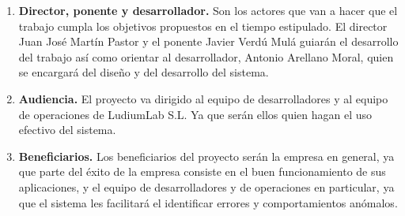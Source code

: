 \begin{enumerate}
	\item \textbf{Director, ponente y desarrollador.} Son los actores que van a hacer que el trabajo cumpla los objetivos propuestos en el tiempo estipulado. El director Juan José Martín Pastor y el ponente Javier Verdú Mulá guiarán el desarrollo del trabajo así como orientar al desarrollador, Antonio Arellano Moral, quien se encargará del diseño y del desarrollo del sistema.
	
	\item \textbf{Audiencia.} El proyecto va dirigido al equipo de desarrolladores y al equipo de operaciones de LudiumLab S.L. Ya que serán ellos quien hagan el uso efectivo del sistema.
	
	\item \textbf{Beneficiarios.} Los beneficiarios del proyecto serán la empresa en general, ya que parte del éxito de la empresa consiste en el buen funcionamiento de sus aplicaciones, y el equipo de desarrolladores y de operaciones en particular, ya que el sistema les facilitará el identificar errores y comportamientos anómalos.
\end{enumerate}
